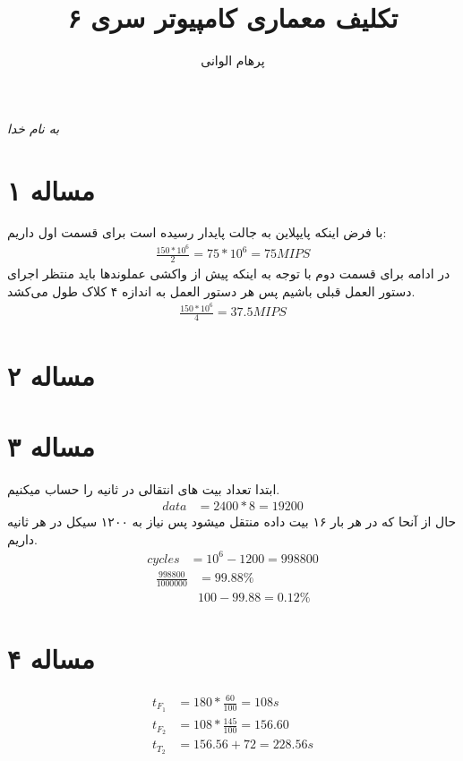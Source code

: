 \documentclass[11pt]{article}
\author{پرهام الوانی}
\title{تکلیف معماری کامپیوتر سری ۶}
\begin{document}
\begin{titlepage}
\begin{center}
\emph{به نام خدا}
\end{center}
\maketitle
\begin{center}
\end{center}
\end{titlepage}
\tableofcontents
\newpage
\section{مساله ۱}
با فرض اینکه پایپلاین به جالت پایدار رسیده است برای قسمت اول داریم:
\begin{align*}
	\frac{150 * 10^6}{2} = 75 * 10^6 = 75 MIPS
\end{align*}
در ادامه برای قسمت دوم با توجه به اینکه پیش از واکشی عملوند‌‌ها باید منتظر اجرای دستور العمل قبلی باشیم پس 
هر دستور العمل به اندازه ۴ کلاک طول می‌کشد.
\begin{align*}
	\frac{150 * 10^6}{4} = 37.5 MIPS 
\end{align*}
\section{مساله ۲}
\section{مساله ۳}
ابتدا تعداد بیت های انتقالی در ثانیه را حساب میکنیم.
\begin{align*}
	data &= 2400 * 8 = 19200
\end{align*}
حال از آنحا که در هر بار ۱۶ بیت داده منتقل میشود پس نیاز به ۱۲۰۰ سیکل در هر ثانیه داریم.
\begin{align*}
	cycles &= 10^6 - 1200 = 998800
\end{align*}
\begin{align*}
	\frac{998800}{1000000} &= 99.88\% \\
	& 100 - 99.88 = 0.12\%
\end{align*}
\section{مساله ۴}
\begin{align*}
	t_{F_{1}} &= 180 * \frac{60}{100} = 108s \\
	t_{F_{2}} &= 108 * \frac{145}{100} = 156.60 \\
	t_{T_{2}} &= 156.56 + 72 = 228.56s
\end{align*}
\end{document}
